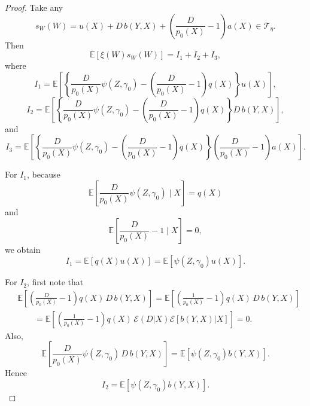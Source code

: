 \documentclass[12pt]{article}
\renewcommand{\(}{\left(}%
\renewcommand{\)}{\right)}%
\renewcommand{\[}{\left[}%
\renewcommand{\]}{\right]}%
\newcommand{\e}{\mathscr{E}}
\newtheorem{proof}{Proof.}}
\begin{document}
\begin{proof}
Take any
\begin{equation*}
s_W(W)=u(X)+D\,b(Y,X)+\left(\frac{D}{p_0(X)}-1\right)a(X)\in\mathcal{T}_{\eta}.
\end{equation*}
Then
\begin{equation*}
\mathbb{E}[\xi(W)s_W(W)]
=
I_1+I_2+I_3,
\end{equation*}
where
\begin{equation*}
I_1
=
\mathbb{E}\!\left[
\left\{
\frac{D}{p_0(X)}\psi(Z,\gamma_0)
-
\left(\frac{D}{p_0(X)}-1\right)q(X)
\right\}
u(X)
\right],
\end{equation*}
\begin{equation*}
I_2
=
\mathbb{E}\!\left[
\left\{
\frac{D}{p_0(X)}\psi(Z,\gamma_0)
-
\left(\frac{D}{p_0(X)}-1\right)q(X)
\right\}
D\,b(Y,X)
\right],
\end{equation*}
and
\begin{equation*}
I_3
=
\mathbb{E}\!\left[
\left\{
\frac{D}{p_0(X)}\psi(Z,\gamma_0)
-
\left(\frac{D}{p_0(X)}-1\right)q(X)
\right\}
\left(\frac{D}{p_0(X)}-1\right)a(X)
\right].
\end{equation*}

For $I_1$, because
\begin{equation*}
\mathbb{E}\!\left[\frac{D}{p_0(X)}\psi(Z,\gamma_0)\mid X\right]=q(X)
\end{equation*}
and
\begin{equation*}
\mathbb{E}\!\left[\frac{D}{p_0(X)}-1\mid X\right]=0,
\end{equation*}
we obtain
\begin{equation*}
I_1
=
\mathbb{E}[q(X)u(X)]
=
\mathbb{E}[\psi(Z,\gamma_0)u(X)].
\end{equation*}

For $I_2$, first note that
\begin{equation*}
\begin{split}
	&\mathbb{E}\!\left[
\left(\frac{D}{p_0(X)}-1\right)q(X)\,D\,b(Y,X)
\right]
	=\mathbb{E}\!\left[
\left(\frac{1}{p_0(X)}-1\right)q(X)\,D\,b(Y,X)
\right]\\
&\qquad=\mathbb{E}\!\left[
\left(\frac{1}{p_0(X)}-1\right)q(X)\,\e(D|X)\e[b(Y,X)|X]
\right] 
=
0.
\end{split}
\end{equation*}
Also,
\begin{equation*}
\mathbb{E}\!\left[\frac{D}{p_0(X)}\psi(Z,\gamma_0)\,D\,b(Y,X)\right]
=
\mathbb{E}[\psi(Z,\gamma_0)b(Y,X)].
\end{equation*}
Hence
\begin{equation*}
I_2=\mathbb{E}[\psi(Z,\gamma_0)b(Y,X)].
\end{equation*}


\end{proof}
\end{document}
